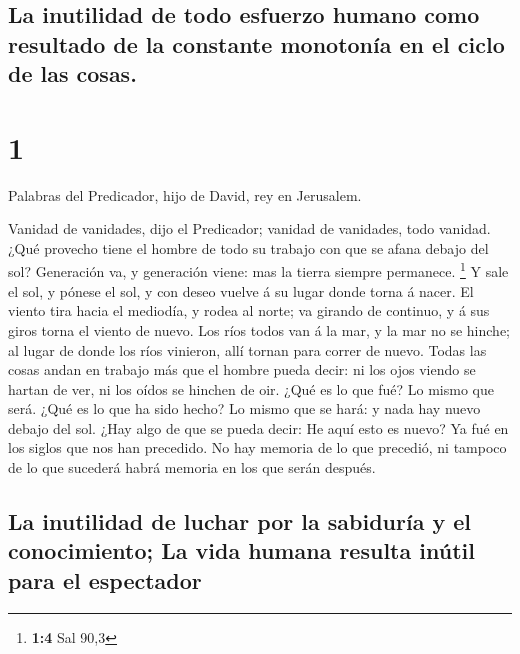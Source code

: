 \hypertarget{la-inutilidad-de-todo-esfuerzo-humano-como-resultado-de-la-constante-monotonuxeda-en-el-ciclo-de-las-cosas.}{%
\subsection{La inutilidad de todo esfuerzo humano como resultado de la
constante monotonía en el ciclo de las
cosas.}\label{la-inutilidad-de-todo-esfuerzo-humano-como-resultado-de-la-constante-monotonuxeda-en-el-ciclo-de-las-cosas.}}

\hypertarget{section}{%
\section{1}\label{section}}

 Palabras del Predicador, hijo de David, rey en Jerusalem.

 Vanidad de vanidades, dijo el Predicador; vanidad de
vanidades, todo vanidad.  ¿Qué provecho tiene el hombre de
todo su trabajo con que se afana debajo del sol? 
Generación va, y generación viene: mas la tierra siempre permanece.
\footnote{\textbf{1:4} Sal 90,3}  Y sale el sol, y pónese
el sol, y con deseo vuelve á su lugar donde torna á nacer.
 El viento tira hacia el mediodía, y rodea al norte; va
girando de continuo, y á sus giros torna el viento de nuevo.
 Los ríos todos van á la mar, y la mar no se hinche; al
lugar de donde los ríos vinieron, allí tornan para correr de nuevo.
 Todas las cosas andan en trabajo más que el hombre pueda
decir: ni los ojos viendo se hartan de ver, ni los oídos se hinchen de
oir.  ¿Qué es lo que fué? Lo mismo que será. ¿Qué es lo
que ha sido hecho? Lo mismo que se hará: y nada hay nuevo debajo del
sol.  ¿Hay algo de que se pueda decir: He aquí esto es
nuevo? Ya fué en los siglos que nos han precedido.  No
hay memoria de lo que precedió, ni tampoco de lo que sucederá habrá
memoria en los que serán después.

\hypertarget{la-inutilidad-de-luchar-por-la-sabiduruxeda-y-el-conocimiento-la-vida-humana-resulta-inuxfatil-para-el-espectador}{%
\subsection{La inutilidad de luchar por la sabiduría y el conocimiento;
La vida humana resulta inútil para el
espectador}\label{la-inutilidad-de-luchar-por-la-sabiduruxeda-y-el-conocimiento-la-vida-humana-resulta-inuxfatil-para-el-espectador}}

